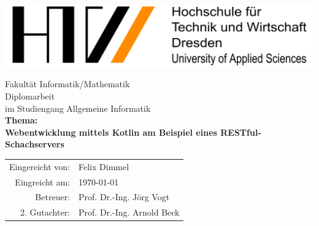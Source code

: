 

\begin{titlepage}
	\begin{center}
		\includegraphics[width=1\textwidth]{images/HTW-Logo.png}
	\end{center}
	\Large
	\centering	
	Fakultät Informatik/Mathematik
	\mbox{}\vspace{2\baselineskip}\\
	\huge
	Diplomarbeit
	\vspace{1\baselineskip}\\
	\large
	im Studiengang Allgemeine Informatik
	\vspace{4\baselineskip}\\
	\Large
	\textbf{Thema:}\\
	\textbf{Webentwicklung mittels Kotlin am Beispiel eines RESTful-Schachservers}
	\vspace{4\baselineskip}\\
	\large
	\begin{tabular}{rl}
		Eingereicht von: & Felix Dimmel \\
		Eingreicht am: & \today \\
		Betreuer: & Prof. Dr.-Ing. Jörg Vogt \\
		2. Gutachter: & Prof. Dr.-Ing. Arnold Beck
	\end{tabular}
\end{titlepage}

% 

